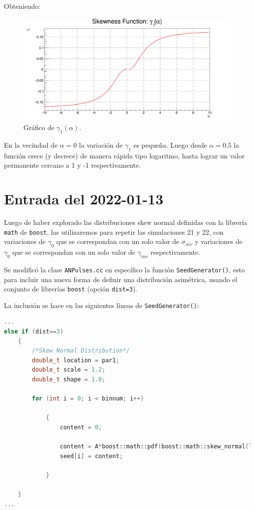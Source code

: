 \documentclass[11pt,letterpaper]{article}
\begin{document}
Obteniendo:

 \begin{figure}[H]
    \includegraphics[width=1.\textwidth]{img/skewness_function.png}
    \centering
     \cprotect\caption{Gráfico de $\gamma_{1}(\alpha)$.} 
\label{skewness_function}
\end{figure}

En la vecindad de $\alpha=0$ la variación de $\gamma_1$ es pequeña. Luego desde $\alpha=0.5$ la función crece (y decrece) de manera rápida tipo logaritmo, hasta lograr un valor permanente cercano a 1 y -1 respectivamente.

\section{Entrada del 2022-01-13}
\label{2022-01-13}

Luego de haber explorado las distribuciones skew normal definidas con la librería \verb|math| de \verb|boost|, las utilizaremos para repetir las simulaciones 21 y 22, con variaciones de $\gamma_{0}$ que se correspondan con un solo valor de $\sigma_{inv}$ y variaciones de $\gamma_{0}$ que se correspondan con un solo valor de $\gamma_{inv}$ respectivamente.

Se modificó la clase \verb|ANPulses.cc| en específico la función \verb|SeedGenerator()|, esto para incluir una nueva forma de definir una distribución asimétrica, usando el conjunto de librerías \verb|boost| (opción \verb|dist=3|). 

La inclusión se hace en las siguientes líneas de \verb|SeedGenerator()|:

\begin{lstlisting}[language=c++]
...
else if (dist==3)
	{
		/*Skew Normal Distribution*/
		double_t location = par1;
		double_t scale = 1.2;
		double_t shape = 1.0;

		for (int i = 0; i < binnum; i++)
		
			{
				content = 0;
		
				content = A*boost::math::pdf(boost::math::skew_normal(location, scale, SIG_L),bins[i]); //1.5
				seed[i] = content;
						
			}
		
	}
...
\end{lstlisting}
\end{document}
